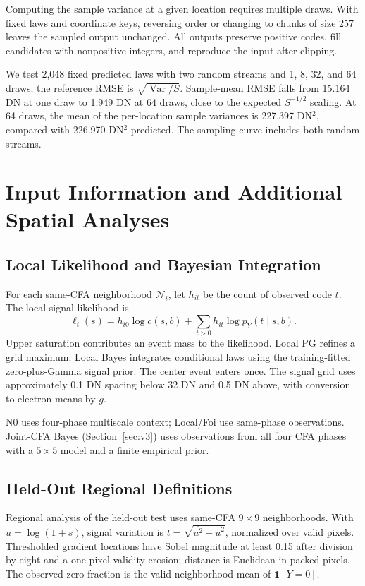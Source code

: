 \documentclass[10pt,twocolumn,journal]{IEEEtran}
\begin{document}
Computing the sample variance at a given location requires multiple draws. With fixed laws and coordinate keys, reversing order or changing to chunks of size 257 leaves the sampled output unchanged. All outputs preserve positive codes, fill candidates with nonpositive integers, and reproduce the input after clipping.

We test 2,048 fixed predicted laws with two random streams and 1, 8, 32, and 64 draws; the reference RMSE is $\sqrt{\operatorname{Var}/S}$. Sample-mean RMSE falls from 15.164 DN at one draw to 1.949 DN at 64 draws, close to the expected $S^{-1/2}$ scaling. At 64 draws, the mean of the per-location sample variances is 227.397 DN$^2$, compared with 226.970 DN$^2$ predicted. The sampling curve includes both random streams.



\section{Input Information and Additional Spatial Analyses}
\subsection{Local Likelihood and Bayesian Integration}
For each same-CFA neighborhood $\mathcal N_i$, let $h_{it}$ be the count of observed code $t$. The local signal likelihood is
\begin{equation}
\ell_i(s)=h_{i0}\log c(s,b)+\sum_{t>0}h_{it}\log p_Y(t\mid s,b).
\end{equation}
Upper saturation contributes an event mass to the likelihood. Local PG refines a grid maximum; Local Bayes integrates conditional laws using the training-fitted zero-plus-Gamma signal prior. The center event enters once. The signal grid uses approximately 0.1 DN spacing below 32 DN and 0.5 DN above, with conversion to electron means by $g$.

N0 uses four-phase multiscale context; Local/Foi use same-phase observations. Joint-CFA Bayes (Section~\ref{sec:v3}) uses observations from all four CFA phases with a $5\times5$ model and a finite empirical prior.

\subsection{Held-Out Regional Definitions}\label{sec:regionaldefinitions}
Regional analysis of the held-out test uses same-CFA $9\times9$ neighborhoods. With $u=\log(1+s)$, signal variation is $t=\sqrt{\overline{u^2}-\bar u^2}$, normalized over valid pixels. Thresholded gradient locations have Sobel magnitude at least 0.15 after division by eight and a one-pixel validity erosion; distance is Euclidean in packed pixels. The observed zero fraction is the valid-neighborhood mean of $\mathbf1[Y=0]$.
\end{document}
